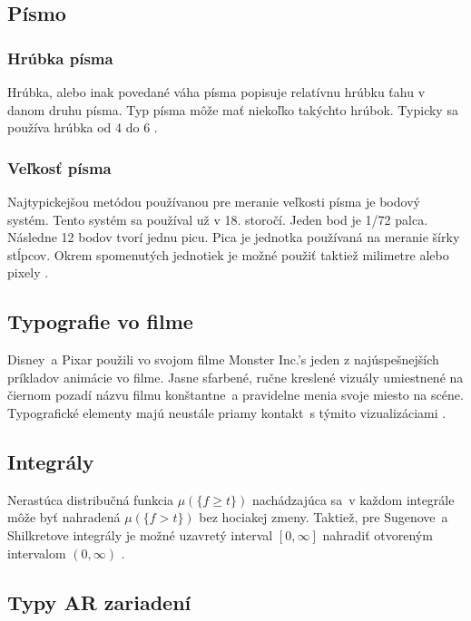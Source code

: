 \documentclass[a4paper, titlepage, 11pt]{article}
\begin{document}
\subsection{Písmo}

  \subsubsection{Hrúbka písma}

    Hrúbka, alebo inak povedané váha písma popisuje relatívnu hrúbku ťahu v danom druhu písma. Typ písma môže mať niekoľko takýchto hrúbok. Typicky sa používa hrúbka od 4 do 6
    \cite{article:79535}.

  \subsubsection{Veľkosť písma}

    Najtypickejšou metódou používanou pre meranie veľkosti písma je bodový systém. Tento systém sa používal už v 18. storočí. Jeden bod je 1/72 palca. Následne 12 bodov tvorí jednu picu. Pica je jednotka používaná na meranie šírky stĺpcov. Okrem spomenutých jednotiek je možné použiť taktiež milimetre alebo pixely
    \cite{article:71564}.

\subsection{Typografie vo filme}

  Disney~a Pixar použili vo svojom filme Monster Inc.'s jeden z najúspešnejších príkladov animácie vo filme. Jasne sfarbené, ručne kreslené vizuály umiestnené na čiernom pozadí názvu filmu konštantne~a pravidelne menia svoje miesto na scéne. Typografické elementy majú neustále priamy kontakt~s týmito vizualizáciami
  \cite{article:42364}.


\subsection{Integrály}

  Nerastúca distribučná funkcia $\mu(\{f \geq t\})$ nachádzajúca sa~v každom integrále môže byť nahradená $\mu(\{f > t\})$ bez hociakej zmeny. Taktiež, pre Sugenove~a Shilkretove integrály je možné uzavretý interval $[0, \infty]$ nahradiť otvoreným intervalom $(0, \infty)$
  \cite{article:56146}.


\subsection{Typy AR zariadení}
\end{document}
